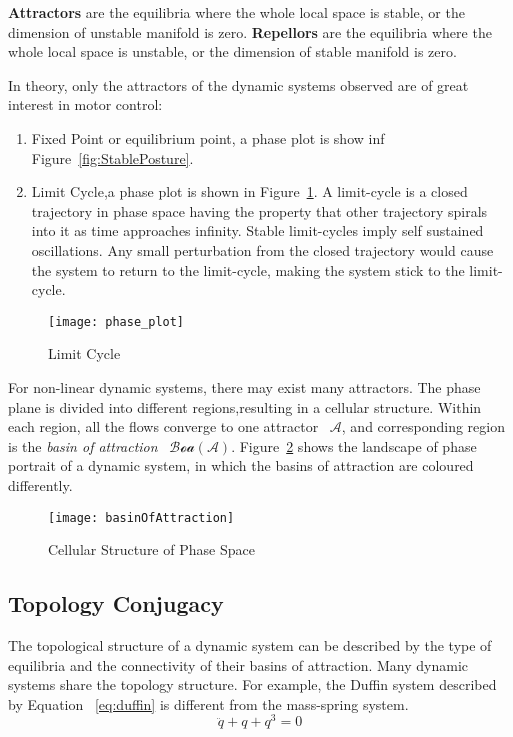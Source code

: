 \textbf{Attractors} are the equilibria where the whole local space is stable, or the dimension of unstable manifold is zero.
\textbf{Repellors} are the equilibria where the whole local space is unstable, or the dimension of stable manifold is zero.







In theory, only the attractors of the dynamic systems  observed are of great interest in motor control:
\begin{enumerate}
 \item Fixed Point or equilibrium point, a phase plot  is show inf Figure~\ref{fig:StablePosture}.
 \item Limit Cycle,a phase plot is shown in Figure~\ref{fig:ecycle}.
 A limit-cycle  is a closed trajectory in phase space having the property that other trajectory spirals into it as time approaches infinity.
Stable limit-cycles imply self sustained oscillations. Any small perturbation from the closed trajectory would cause the system to return to the limit-cycle, making the system stick to the limit-cycle.
\end{enumerate}

\begin{figure}
	\begin{center}
	\texttt{[image: phase\_plot]}
	\end{center}
	\caption{Limit Cycle}
	\label{fig:ecycle}
\end{figure}





For non-linear dynamic systems, there may exist many attractors.
The phase plane is divided into different regions,resulting in a cellular structure.
Within each region, all the flows converge to one attractor ~$\mathcal{A}$,
and corresponding region is  the \emph{basin of attraction} ~$\mathcal{Boa}(\mathcal{A})$.
Figure~\ref{fig:manyboa} shows the landscape of phase portrait of a dynamic system, in which the basins of attraction are coloured differently.
\begin{figure}
\begin{center}
\texttt{[image: basinOfAttraction]}
\end{center}
\caption{Cellular Structure of Phase Space}
\label{fig:manyboa}
\end{figure}




\subsection{Topology Conjugacy}
The topological structure of a dynamic system can be described by the type of equilibria and the connectivity of their basins of attraction.
Many dynamic systems share the topology structure.
For example, the Duffin system described by Equation ~\ref{eq:duffin} is different from the mass-spring system.
\begin{equation}
\label{eq:duffin}
\ddot{q}+q+q^{3}=0
\end{equation}

